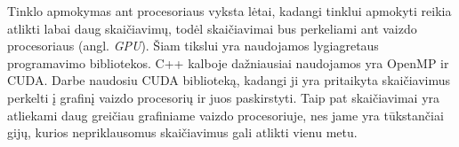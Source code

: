 Tinklo apmokymas ant procesoriaus vyksta lėtai, kadangi tinklui apmokyti reikia atlikti labai daug skaičiavimų, todėl skaičiavimai bus perkeliami ant vaizdo procesoriaus (angl. \textit{GPU}). Šiam tikslui yra naudojamos lygiagretaus programavimo bibliotekos. C++ kalboje dažniausiai naudojamos yra OpenMP ir CUDA. Darbe naudosiu CUDA biblioteką, kadangi ji yra pritaikyta skaičiavimus perkelti į grafinį vaizdo procesorių ir juos paskirstyti. Taip pat skaičiavimai yra atliekami daug greičiau grafiniame vaizdo procesoriuje, nes jame yra tūkstančiai gijų, kurios nepriklausomus skaičiavimus gali atlikti vienu metu. \cite{Fazlul2014}



%
%
%
%
%
%
%
%
%
%
%
%
%
%
%
%
%


%
%
%
%
%
%
%
%
%
%
